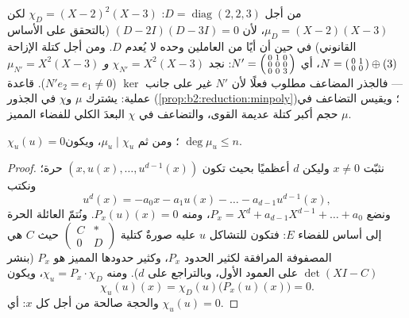 \begin{example}\label{ex:b2:reduction:minvschar}
من أجل $D = \operatorname{diag}(2, 2, 3)$: $\chi_D = (X - 2)^2(X -
3)$ لكن $\mu_D = (X - 2)(X - 3)$، لأن $(D - 2I)(D - 3I) = 0$
(بالتحقق على الأساس القانوني) في حين أن أيًا من العاملين وحده لا يُعدم
$D$. ومن أجل كتلة الإزاحة $N = \begin{psmallmatrix}0 & 1\\ 0 &
0\end{psmallmatrix} \oplus (3)$، أي $N' =
\begin{psmallmatrix}0 & 1 & 0\\ 0 & 0 & 0\\ 0 & 0 &
3\end{psmallmatrix}$: نجد $\chi_{N'} = X^2(X - 3)$ \emph{و}
$\mu_{N'} = X^2(X - 3)$ --- فالجذر المضاعف مطلوب فعلًا
لأن $N'$ غير  على جانب $\ker$ ($N'e_2 =
e_1 \neq 0$). قاعدة عملية: يشترك $\mu$ و$\chi$ في الجذور
(\cref{prop:b2:reduction:minpoly})؛ ويقيس التضاعف في $\mu$
حجم أكبر كتلة عديمة القوى، والتضاعف في
$\chi$ البعدَ الكلي للفضاء المميز.
\end{example}

\begin{theorem}\label{thm:b2:reduction:cayleyhamilton}
$\chi_u(u) = 0$؛ ومن ثم $\mu_u \mid \chi_u$، ويكون $\deg \mu_u
\leq n$.
\end{theorem}

\begin{proof}
نثبّت $x \neq 0$ وليكن $d$ أعظميًا بحيث تكون $(x, u(x), \dots,
u^{d-1}(x))$ حرة؛ ونكتب
\[
u^d(x) = -a_0 x - a_1 u(x) - \dots - a_{d-1}u^{d-1}(x),
\]
ونضع $P_x = X^d + a_{d-1}X^{d-1} + \dots + a_0$، ومنه $P_x(u)(x) =
0$. ونُتمّ العائلة الحرة إلى أساس للفضاء $E$: فتكون للتشاكل $u$ عليه
صورةٌ كتلية $\begin{pmatrix} C & \ast\\ 0 & D\end{pmatrix}$ حيث $C$
هي المصفوفة المرافقة لكثير الحدود $P_x$، وكثير حدودها المميز هو
$P_x$ (بنشر $\det(XI - C)$ على العمود الأول، وبالتراجع على
$d$). ومنه $\chi_u = P_x \cdot \chi_D$، ويكون
\[
\chi_u(u)(x) = \chi_D(u)\bigl(P_x(u)(x)\bigr) = 0 .
\]
والحجة صالحة من أجل كل $x$: أي $\chi_u(u) = 0$.
\end{proof}

